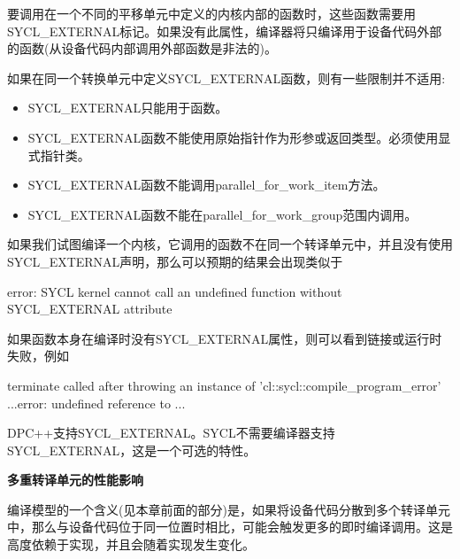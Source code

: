 要调用在一个不同的平移单元中定义的内核内部的函数时，这些函数需要用SYCL\_EXTERNAL标记。如果没有此属性，编译器将只编译用于设备代码外部的函数(从设备代码内部调用外部函数是非法的)。\par

如果在同一个转换单元中定义SYCL\_EXTERNAL函数，则有一些限制并不适用:\par

\begin{itemize}
	\item SYCL\_EXTERNAL只能用于函数。
	\item SYCL\_EXTERNAL函数不能使用原始指针作为形参或返回类型。必须使用显式指针类。
	\item SYCL\_EXTERNAL函数不能调用parallel\_for\_work\_item方法。
	\item SYCL\_EXTERNAL函数不能在parallel\_for\_work\_group范围内调用。
\end{itemize}

如果我们试图编译一个内核，它调用的函数不在同一个转译单元中，并且没有使用SYCL\_EXTERNAL声明，那么可以预期的结果会出现类似于\par

\begin{tcolorbox}[colback=white,colframe=black]
error: SYCL kernel cannot call an undefined function without SYCL\_EXTERNAL attribute
\end{tcolorbox}

如果函数本身在编译时没有SYCL\_EXTERNAL属性，则可以看到链接或运行时失败，例如\par

\begin{tcolorbox}[colback=white,colframe=black]
terminate called after throwing an instance of 'cl::sycl::compile\_program\_error' ...error: undefined reference to ...
\end{tcolorbox}

DPC++支持SYCL\_EXTERNAL。SYCL不需要编译器支持SYCL\_EXTERNAL，这是一个可选的特性。\par

\hspace*{\fill} \par %
\textbf{多重转译单元的性能影响}

编译模型的一个含义(见本章前面的部分)是，如果将设备代码分散到多个转译单元中，那么与设备代码位于同一位置时相比，可能会触发更多的即时编译调用。这是高度依赖于实现，并且会随着实现发生变化。\par

